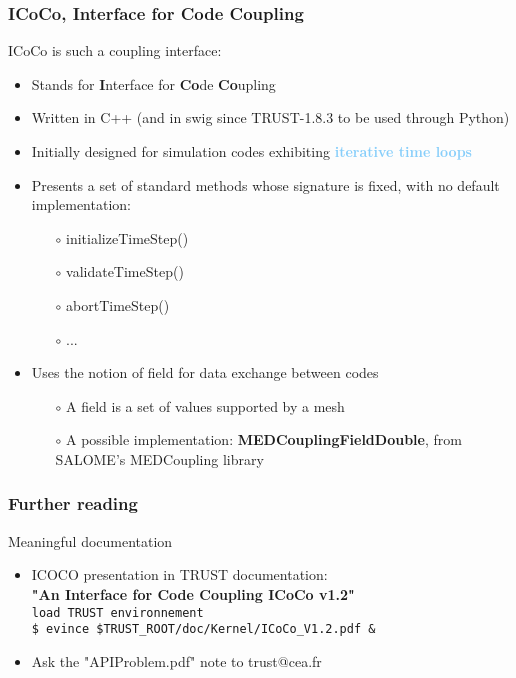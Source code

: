 \documentclass[10pt, hyperref={unicode=true,pdfusetitle, bookmarks=true,bookmarksnumbered=false,bookmarksopen=false, breaklinks=false,pdfborder={0 0 1},backref=true,colorlinks=true,linkcolor=darkblue,pageanchor, urlcolor=darkblue}]{beamer}
\begin{document}
\begin{frame}
\frametitle{ICoCo, \textbf{I}nterface for \textbf{Co}de \textbf{Co}upling}
\begin{block}{}

ICoCo is such a coupling interface:
\begin{itemize}
\item Stands for \textbf{I}nterface for \textbf{Co}de \textbf{Co}upling
\item Written in C++ (and in swig since TRUST-1.8.3 to be used through Python)
\vspace{0.2cm}
\item Initially designed for simulation codes exhibiting \textbf{\textcolor{LightSkyBlue}{iterative time loops}} 
\vspace{0.2cm}
\item Presents a set of standard methods whose signature is fixed, with no default implementation:
    \begin{itemize}
    \item [$\circ$] initializeTimeStep()
    \item [$\circ$] validateTimeStep()
    \item [$\circ$] abortTimeStep()
    \item [$\circ$] ...
    \end{itemize}
\item Uses the notion of field for data exchange between codes
    \begin{itemize}
    \item [$\circ$] A field is a set of values supported by a mesh
    \item [$\circ$] A possible implementation: \textbf{MEDCouplingFieldDouble}, from SALOME's MEDCoupling library
    \end{itemize}
\end{itemize}

\end{block}
\end{frame}
\begin{frame}
\frametitle{Further reading}
\begin{block}{Meaningful documentation}

\begin{itemize}
\item ICOCO presentation in TRUST documentation: \\ \textbf{"An Interface for Code Coupling ICoCo v1.2"} \\
    \hspace{0.5cm}\texttt{load TRUST environnement} \\
    \hspace{0.5cm}\texttt{\$ evince \$TRUST\_ROOT/doc/Kernel/ICoCo\_V1.2.pdf \&}
    \vspace{0.2cm}

    \item Ask the "APIProblem.pdf" note to trust@cea.fr
\end{itemize}

\end{block}
\end{frame}
\end{document}
